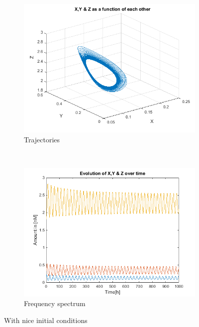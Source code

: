 \documentclass[10pt,a4paper,oneside,twocolumn]{article}
\numberwithin{equation}{section} %
\begin{document}
    \begin{figure}[!h]
	\begin{subfigure}[b]{0.5\textwidth}
	    \includegraphics[width=\textwidth]{A11.png}
	    \caption{Trajectories}
	\end{subfigure}
	~
	\begin{subfigure}[b]{0.5\textwidth}
	    \includegraphics[width=\textwidth]{A12.png}
	    \caption{Frequency spectrum}
	\end{subfigure}
	\caption{With nice initial conditions}
    \end{figure}
\end{document}
